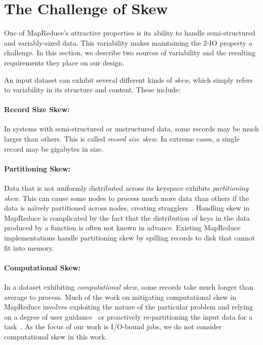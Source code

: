 \section{The Challenge of Skew}
\label{themis:sec:challenges}

One of MapReduce's attractive properties is its ability to handle
semi-structured and variably-sized data.  This variability makes maintaining
the 2-IO property a challenge.  In this section, we describe two sources of
variability and the resulting requirements they place on our design.

An input dataset can exhibit several different kinds of \emph{skew},
which simply refers to variability in its structure and content.  These
include:

\paragraph{Record Size Skew:} In systems with semi-structured or unstructured
data, some records may be much larger than others.  This is called \emph{record
  size skew}.  In extreme cases, a single record may be gigabytes in size.

\paragraph{Partitioning Skew:} Data that is
not uniformly distributed across its keyspace exhibits \emph{partitioning
  skew}.  This can cause some nodes to process much more data than others if
the data is na\"{\i}vely partitioned across nodes, creating
stragglers~\cite{DeWittGraySkew}.  Handling skew in MapReduce is complicated by
the fact that the distribution of keys in the data produced by a \map function
is often not known in advance.  Existing MapReduce implementations handle
partitioning skew by spilling records to disk that cannot fit into memory.

\paragraph{Computational Skew:} In a dataset exhibiting
\emph{computational skew}, some records take much longer than average to
process.  Much of the work on mitigating computational skew in MapReduce
involves exploiting the nature of the particular problem and relying on a
degree of user guidance~\cite{SkewReduce} or proactively re-partitioning
the input data for a task~\cite{SkewTune}.  As the focus of our work is
I/O-bound jobs, we do not consider computational skew in this work.

